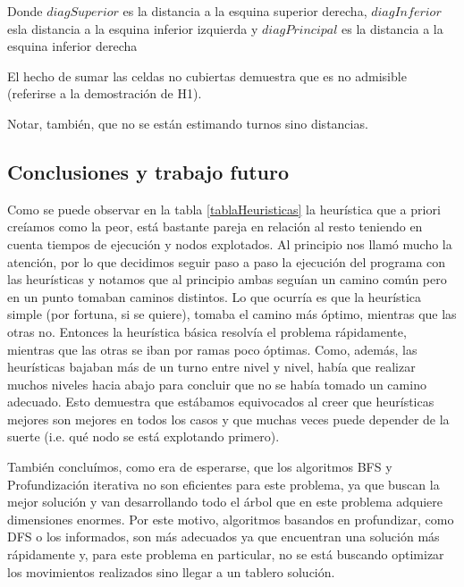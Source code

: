 \documentclass{article}
\begin{document}
Donde $diagSuperior$ es la distancia a la esquina superior derecha, $diagInferior$ esla distancia a la esquina inferior izquierda y $diagPrincipal$ es la distancia a la esquina inferior derecha

El hecho de sumar las celdas no cubiertas demuestra que es no admisible (referirse a la demostraci\'on de H1).

Notar, tambi\'en, que no se est\'an estimando turnos sino distancias.

\subsection{Conclusiones y trabajo futuro}

Como se puede observar en la tabla \ref{tablaHeuristicas} la heur\'istica que a priori cre\'iamos como la peor, est\'a bastante pareja en 
relaci\'on al resto teniendo en cuenta tiempos de ejecuci\'on y nodos explotados. Al principio nos llam\'o mucho la atenci\'on, por lo 
que decidimos seguir paso a paso la ejecuci\'on del programa con las heur\'isticas y notamos que al principio ambas segu\'ian un camino 
com\'un pero en un punto tomaban caminos distintos. Lo que ocurr\'ia es que la heur\'istica simple (por fortuna, si se quiere), tomaba el 
camino m\'as \'optimo, mientras que las otras no. Entonces la heur\'istica b\'asica resolv\'ia el problema r\'apidamente, mientras que las 
otras se iban por ramas poco \'optimas. Como, adem\'as, las heur\'isticas bajaban m\'as de un turno entre nivel y nivel, hab\'ia que realizar 
muchos niveles hacia abajo para concluir que no se hab\'ia tomado un camino adecuado. Esto demuestra que est\'abamos equivocados al creer 
que heur\'isticas mejores son mejores en todos los casos y que muchas veces puede depender de la suerte (i.e. qu\'e nodo se est\'a explotando 
primero).

Tambi\'en conclu\'imos, como era de esperarse, que los algoritmos 
BFS y Profundizaci\'on iterativa no son eficientes para este problema, ya que buscan la mejor soluci\'on y van desarrollando todo el \'arbol que en este problema adquiere dimensiones enormes. Por este motivo, algoritmos basandos en profundizar, como DFS o los informados, son m\'as adecuados ya que encuentran una soluci\'on m\'as r\'apidamente y, para este problema en particular, no se est\'a buscando optimizar los movimientos realizados sino llegar a un tablero soluci\'on.
\end{document}
